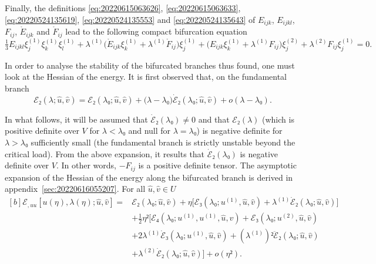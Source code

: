 \documentclass[12pt, final]{scrartcl}
\theoremstyle{definition}
\newcommand{\E}{\mathcal E}
\newcommand{\order}[2][1]{#2^{(#1)}}
\begin{document}
Finally, the definitions \eqref{eq:20220615063626}, \eqref{eq:20220615063633},
\eqref{eq:20220524135619}, \eqref{eq:20220524135553} and
\eqref{eq:20220524135643} of $E_{ijk}$, $E_{ijkl}$, $F_{ij}$,
$\mathring{E}_{ijk}$ and $\mathring{F}_{ij}$ lead to the following compact
bifurcation equation
\begin{equation}
  \label{eq:20220601070917}
  \tfrac{1}{3} E_{ijkl} \order[1]{ξ_j} \order[1]{ξ_k} \order[1]{ξ_l} + \order[1]\lambda \bigl( \mathring{E}_{ijk} \order[1]{ξ_k} + \order[1]\lambda \mathring{F}_{ij} \bigr)\order[1]{ξ_j} + \bigl(E_{ijk} \order[1]{ξ_k} + \order[1]\lambda F_{ij}\bigr) \order[2]{ξ_j} + \order[2]\lambda F_{ij} \order[1]{ξ_j} = 0.
\end{equation}

In order to analyse the stability of the bifurcated branches thus found, one
must look at the Hessian of the energy. It is first observed that, on the
fundamental branch
\begin{equation}
 \E₂(\lambda; \hat{u}, \hat{v}) = \E₂(\lambda₀; \hat{u}, \hat{v}) + \bigl(\lambda - \lambda₀\bigr) \dot{\E}₂(\lambda₀; \hat{u}, \hat{v}) + o(\lambda - \lambda₀).
\end{equation}

In what follows, it will be assumed that $\dot{\E}₂(\lambda₀)≠0$ and that $\E₂(\lambda)$
(which is positive definite over $V$ for $\lambda<\lambda₀$ and null for $\lambda=\lambda₀$) is
negative definite for $\lambda>\lambda₀$ sufficiently small (the fundamental branch is
strictly unstable beyond the critical load). From the above expansion, it
results that $\dot{\E}₂(\lambda₀)$ is negative definite over $V$. In other words,
$-F_{ij}$ is a positive definite tensor. The asymptotic expansion of the
Hessian of the energy along the bifurcated branch is derived in
appendix~\ref{sec:20220616055207}. For all $\hat{u}, \hat{v} \in U$
\begin{equation}
  \label{eq:20220531054247}
  \begin{aligned}[b]
    \E_{, uu}[u(η), \lambda(η); \hat{u}, \hat{v}] ={}
    & \E₂(\lambda₀ ; \hat{u}, \hat{v}) + η \bigl[\E₃(\lambda₀ ; \order[1]u, \hat{u}, \hat{v})  + \order[1]\lambda \dot{\E}₂(\lambda₀; \hat{u}, \hat{v})\bigr]\\
    &+ \tfrac{1}{2} η² \bigl[\E₄(\lambda₀; \order[1]u, \order[1]u, \hat{u}, \hat{v}) + \E₃(\lambda₀; \order[2]u, \hat{u}, \hat{v})\\
    & + 2\order[1]\lambda \dot{\E}₃(\lambda₀; \order[1]u, \hat{u}, \hat{v}) + ( \order[1]\lambda )² \ddot{\E}₂(\lambda₀; \hat{u}, \hat{v})\\
    & + \order[2]\lambda \dot{\E}₂(\lambda₀; \hat{u}, \hat{v}) \bigr] + o(η²).
  \end{aligned}
\end{equation}
\end{document}
